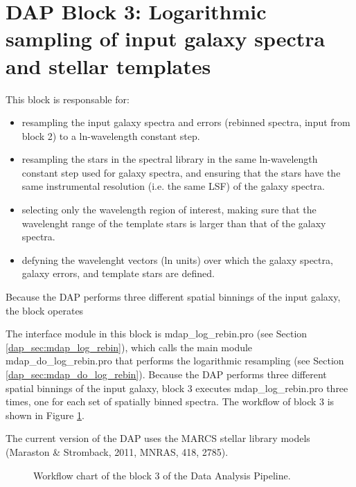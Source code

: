 \documentclass[11pt]{book}
\begin{document}


\section[DAP Block 3: Logarithmic sampling]{DAP Block 3: Logarithmic sampling of input galaxy spectra and stellar templates}
\label{dap_sec:block3}

This block is responsable for:

\begin{itemize}

\item resampling the input galaxy spectra and errors (rebinned
  spectra, input from block 2) to a ln-wavelength constant step.

\item resampling the stars in the spectral library in the same
  ln-wavelength constant step used for galaxy spectra, and ensuring
  that the stars have the same instrumental resolution (i.e. the same
  LSF) of the galaxy spectra.

\item selecting only the wavelength region of interest, making sure
  that the wavelenght range of the template stars is larger than that
  of the galaxy spectra.

\item defyning the wavelenght vectors (ln units) over which the galaxy
  spectra, galaxy errors, and template stars are defined.

\end{itemize}

Because the DAP performs three different spatial binnings of the input
galaxy, the block operates

The interface module in this block is mdap\_log\_rebin.pro (see
Section \ref{dap_sec:mdap_log_rebin}), which calls the main module
mdap\_do\_log\_rebin.pro that performs the logarithmic resampling (see
Section \ref{dap_sec:mdap_do_log_rebin}). Because the DAP performs
three different spatial binnings of the input galaxy, block 3 executes
mdap\_log\_rebin.pro three times, one for each set of spatially binned
spectra. The workflow of block 3 is shown in Figure
\ref{dap_fig:block3}.

The current version of the DAP uses the MARCS stellar library models
(Maraston \& Stromback, 2011, MNRAS, 418, 2785).

\begin{figure}
\begin{center}
\caption{Workflow chart of the block 3 of the Data Analysis
  Pipeline.}
 \label{dap_fig:block3}
\end{center}
\end{figure}
\end{document}
